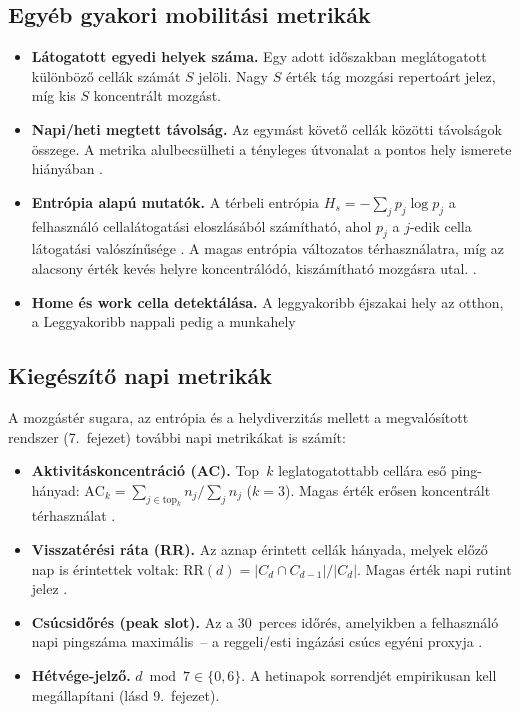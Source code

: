 \subsection{Egyéb gyakori mobilitási metrikák}
\begin{itemize}
	\item \textbf{Látogatott egyedi helyek száma.} Egy adott időszakban
		meglátogatott különböző cellák számát $S$ jelöli. Nagy $S$ érték tág mozgási
		repertoárt jelez, míg kis $S$ koncentrált mozgást.

	\item \textbf{Napi/heti megtett távolság.} Az egymást követő cellák közötti
		távolságok összege. A metrika alulbecsülheti a tényleges útvonalat a pontos hely
		ismerete hiányában \cite{gonzalez2008understanding}.

	\item \textbf{Entrópia alapú mutatók.} A térbeli entrópia
		$H_{s} = -\sum_{j} p_{j} \log p_{j}$ a felhasználó cellalátogatási
		eloszlásából számítható, ahol $p_{j}$ a $j$-edik cella látogatási
		valószínűsége \cite{pinter2021evaluating}. A magas entrópia változatos térhasználatra,
		míg az alacsony érték kevés helyre koncentrálódó, kiszámítható mozgásra utal.
		\cite{pinter2022awakening}.

	\item \textbf{Home és work cella detektálása.} A leggyakoribb éjszakai hely az
		otthon, a Leggyakoribb nappali pedig a munkahely\cite{pinter2021evaluating, pinter2022awakening}

\end{itemize}

\subsection{Kiegészítő napi metrikák}
\label{subsec:extra_metrics}

A mozgástér sugara, az entrópia és a helydiverzitás mellett a megvalósított rendszer (7.\ fejezet) további napi metrikákat is számít:

\begin{itemize}
	\item \textbf{Aktivitáskoncentráció (AC).} Top~$k$ leglatogatottabb cellára eső ping-hányad: $\mathrm{AC}_k = \sum_{j \in \mathrm{top}_k} n_j / \sum_j n_j$ ($k=3$). Magas érték erősen koncentrált térhasználat \cite{pinter2022awakening}.

\item \textbf{Visszatérési ráta (RR).} Az aznap érintett cellák hányada, melyek előző nap is érintettek voltak: $\mathrm{RR}(d) = |C_d \cap C_{d-1}| / |C_d|$. Magas érték napi rutint jelez \cite{gonzalez2008understanding}.

\item \textbf{Csúcsidőrés (peak slot).} Az a 30~perces időrés, amelyikben a felhasználó napi pingszáma maximális~-- a reggeli/esti ingázási csúcs egyéni proxyja \cite{pinter2022awakening}.

\item \textbf{Hétvége-jelző.} $d \bmod 7 \in \{0, 6\}$. A hetinapok sorrendjét empirikusan kell megállapítani (lásd 9.\ fejezet).
\end{itemize}
